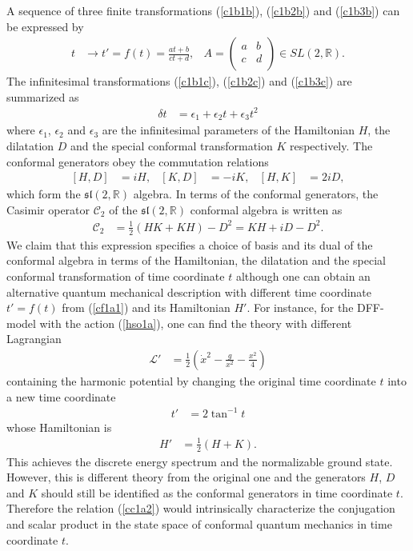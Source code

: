 \documentclass[12pt]{article}
\numberwithin{equation}{section}
\begin{document}
%
A sequence of three finite transformations 
(\ref{c1b1b}), (\ref{c1b2b}) and (\ref{c1b3b}) can be expressed by 
\begin{align}
\label{cf1a1}
t&\rightarrow t'=f(t)=\frac{at+b}{ct+d}, &
A=\left(
\begin{array}{cc}
a&b\\
c&d\\
\end{array}
\right)\in SL(2,\mathbb{R}). 
\end{align}
The infinitesimal transformations 
(\ref{c1b1c}), (\ref{c1b2c}) and (\ref{c1b3c}) are summarized as
\begin{align}
\label{ci1a1}
\delta t&=\epsilon_{1}+\epsilon_{2}t+\epsilon_{3}t^{2}
\end{align}
where $\epsilon_{1}$, $\epsilon_{2}$ and $\epsilon_{3}$ 
are the infinitesimal parameters 
of the Hamiltonian $H$, 
the dilatation $D$ 
and the special conformal transformation $K$ 
respectively. 
The conformal generators obey the commutation relations
\begin{align}
\label{cc1a1}
[H,D]&=iH,& [K,D]&=-iK,& [H,K]&=2iD,
\end{align}
which form the $\mathfrak{sl}(2,\mathbb{R})$ algebra. 
In terms of the conformal generators, 
the Casimir operator $\mathcal{C}_{2}$ 
of the $\mathfrak{sl}(2,\mathbb{R})$ conformal algebra is written as 
\begin{align}
\label{cc1a2}
\mathcal{C}_{2}&=\frac12 (HK+KH)-D^{2}=KH+iD-D^{2}.
\end{align}
We claim that 
this expression specifies a choice of basis and its dual of the conformal algebra 
in terms of the Hamiltonian, the dilatation and the special conformal transformation of time coordinate $t$ 
although one can obtain an alternative quantum mechanical description with different time coordinate 
$t'=f(t)$ from (\ref{cf1a1}) and its Hamiltonian $H'$. 
For instance, 
for the DFF-model \cite{deAlfaro:1976je} with the action (\ref{hso1a}), 
one can find the theory with different Lagrangian 
\begin{align}
\label{dffnew1}
\mathcal{L}'&=\frac12 \left(
\dot{x}^{2}-\frac{g}{x^{2}}-\frac{x^{2}}{4}
\right)
\end{align}
containing the harmonic potential by changing the original time coordinate $t$ into a new time coordinate
\begin{align}
\label{dffnew2}
t'&=2\tan^{-1}t
\end{align}
whose Hamiltonian is 
\begin{align}
\label{dffnew3}
H'&=\frac12(H+K). 
\end{align}
This achieves the discrete energy spectrum and the normalizable ground state. 
However, this is different theory from the original one 
and the generators $H$, $D$ and $K$ should still be identified as the conformal generators in time coordinate $t$. 
Therefore the relation (\ref{cc1a2}) would intrinsically characterize 
the conjugation and scalar product in the state space of conformal quantum mechanics in time coordinate $t$. 
\end{document}
